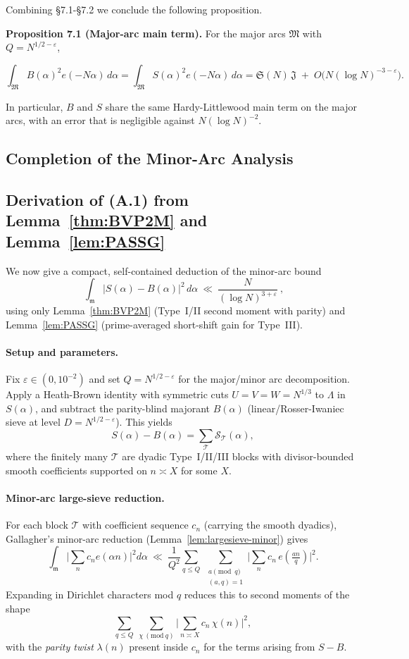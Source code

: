 \documentclass[11pt]{article}
\theoremstyle{definition}
\theoremstyle{remark}
\numberwithin{equation}{part}
\begin{document}
Combining §7.1-§7.2 we conclude the following proposition.

\noindent\textbf{Proposition 7.1 (Major-arc main term).} For the major arcs $\mathfrak M$ with $Q=N^{1/2-\varepsilon}$,

$$
	\int_{\mathfrak M} B(\alpha)^2 e(-N\alpha)\,d\alpha
	=\int_{\mathfrak M} S(\alpha)^2 e(-N\alpha)\,d\alpha
	=\mathfrak S(N)\,\mathfrak J\;+\;O\!\big(N(\log N)^{-3-\varepsilon}\big).
$$

In particular, $B$ and $S$ share the same Hardy-Littlewood main term on the major arcs, with an error that is negligible against $N(\log N)^{-2}$.

\subsection*{Completion of the Minor-Arc Analysis}

\subsection*{Derivation of \texorpdfstring{(A.1)}{(A.1)} from Lemma~\ref{thm:BVP2M} and Lemma~\ref{lem:PASSG}}

We now give a compact, self-contained deduction of the minor-arc bound
\[
	\boxed{\ \ \int_{\mathfrak m}\!\bigl|S(\alpha)-B(\alpha)\bigr|^{2}\,d\alpha
		\ \ll\ \frac{N}{(\log N)^{3+\varepsilon}}\ ,\ }
	\tag{A.1}
\]
using only Lemma~\ref{thm:BVP2M} (Type~I/II second moment with parity) and Lemma~\ref{lem:PASSG} (prime-averaged short-shift gain for Type~III).

\paragraph{Setup and parameters.}
Fix $\varepsilon\in(0,10^{-2})$ and set $Q=N^{1/2-\varepsilon}$ for the major/minor arc decomposition.
Apply a Heath-Brown identity with symmetric cuts $U=V=W=N^{1/3}$ to $\Lambda$ in $S(\alpha)$, and subtract the parity-blind majorant $B(\alpha)$ (linear/Rosser-Iwaniec sieve at level $D=N^{1/2-\varepsilon}$).
This yields
\[
	S(\alpha)-B(\alpha)=\sum_{\mathcal T}\mathcal S_{\mathcal T}(\alpha),
\]
where the finitely many $\mathcal T$ are dyadic Type~I/II/III blocks with divisor-bounded smooth coefficients supported on $n\asymp X$ for some $X$.

\paragraph{Minor-arc large-sieve reduction.}
For each block $\mathcal T$ with coefficient sequence $c_n$ (carrying the smooth dyadics), Gallagher's minor-arc reduction (Lemma~\ref{lem:largesieve-minor}) gives
\[
	\int_{\mathfrak m}\Big|\sum_n c_n e(\alpha n)\Big|^2 d\alpha
	\ \ll\ \frac{1}{Q^2}\sum_{q\le Q}\ \sum_{\substack{a\!\!\!\!\pmod q\\(a,q)=1}}
	\Big|\sum_n c_n\,e\!\left(\tfrac{an}{q}\right)\Big|^2.
\]
Expanding in Dirichlet characters mod $q$ reduces this to second moments of the shape
\[
	\sum_{q\le Q}\ \sum_{\chi\ (\mathrm{mod}\ q)}
	\Big|\sum_{n\asymp X} c_n\,\chi(n)\Big|^2,
\]
with the \emph{parity twist} $\lambda(n)$ present inside $c_n$ for the terms arising from $S-B$.
\end{document}
